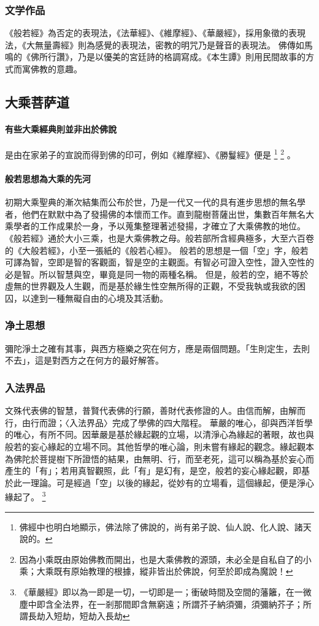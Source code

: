 \subsubsection{文学作品}
《般若經》為否定的表現法，《法華經》、《維摩經》、《華嚴經》，採用象徵的表現法，《大無量壽經》則為感覺的表現法，密教的明咒乃是聲音的表現法。
佛傳如馬鳴的《佛所行讚》，乃是以優美的宮廷詩的格調寫成。《本生譚》則用民間故事的方式而寓佛教的意趣。

\subsection{大乘菩萨道}
\paragraph{有些大乘經典則並非出於佛說}
是由在家弟子的宣說而得到佛的印可，例如《維摩經》、《勝鬘經》便是
\footnote{佛經中也明白地顯示，佛法除了佛說的，尚有弟子說、仙人說、化人說、諸天說的。}
\footnote{因為小乘既由原始佛教而開出，也是大乘佛教的源頭，未必全是自私自了的小乘；大乘既有原始教理的根據，縱非皆出於佛說，何至於即成為魔說！}
。
\paragraph{般若思想為大乘的先河}
初期大乘聖典的漸次結集而公布於世，乃是一代又一代的具有進步思想的無名學者，他們在默默中為了發揚佛的本懷而工作。直到龍樹菩薩出世，集數百年無名大乘學者的工作成果於一身，予以蒐集整理著述發揚，才確立了大乘佛教的地位。
《般若經》通於大小三乘，也是大乘佛教之母。般若部所含經典極多，大至六百卷的《大般若經》，小至一張紙的《般若心經》。
般若的思想是一個「空」字，般若可譯為智，空即是智的客觀面，智是空的主觀面。有智必可證入空性，證入空性的必是智。所以智慧與空，畢竟是同一物的兩種名稱。
但是，般若的空，絕不等於虛無的世界觀及人生觀，而是基於緣生性空無所得的正觀，不受我執或我欲的困囚，以達到一種無礙自由的心境及其活動。

\subsubsection{净土思想}
彌陀淨土之確有其事，與西方極樂之究在何方，應是兩個問題。「生則定生，去則不去」，這是對西方之在何方的最好解答。

\subsubsection{入法界品}
文殊代表佛的智慧，普賢代表佛的行願，善財代表修證的人。由信而解，由解而行，由行而證；〈入法界品〉完成了學佛的四大階程。
華嚴的唯心，卻與西洋哲學的唯心，有所不同。因華嚴是基於緣起觀的立場，以清淨心為緣起的著眼，故也與般若的妄心緣起的立場不同。其他哲學的唯心論，則未嘗有緣起的觀念。緣起觀本為佛陀於菩提樹下所證悟的結果，由無明、行，而至老死，這可以稱為基於妄心而產生的「有」；若用真智觀照，此「有」是幻有，是空，般若的妄心緣起觀，即基於此一理論。可是經過「空」以後的緣起，從妙有的立場看，這個緣起，便是淨心緣起了。
\footnote{《華嚴經》即以為一即是一切，一切即是一；衝破時間及空間的藩籬，在一微塵中即含全法界，在一剎那間即含無窮遠；所謂芥子納須彌，須彌納芥子；所謂長劫入短劫，短劫入長劫}

